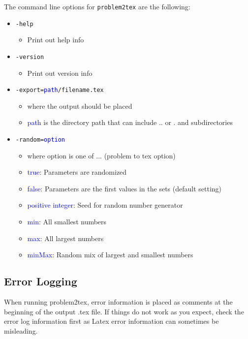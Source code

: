 \documentclass{article}
\begin{document}
The command line options for \texttt{problem2tex} are the following:
\begin{itemize}
\item \texttt{-help}
\begin{itemize}
\item[] Print out help info
\end{itemize}
\item \texttt{-version}
\begin{itemize}
\item[] Print out version info
\end{itemize}
\item \texttt{-export=\textcolor{blue}{path}/filename.tex} 
\begin{itemize}
\item[] where the output should be placed 
\item[] \textcolor{blue}{path} is the directory path that can include .. or . and subdirectories
\end{itemize}
\item \texttt{-random=\textcolor{blue}{option}}
\begin{itemize}
\item[] where option is one of ... (problem to tex option)
\item[] \textcolor{blue}{true}: Parameters are randomized
\item[] \textcolor{blue}{false}: Parameters are the first values in the sets (default setting)
\item[] \textcolor{blue}{positive integer}: Seed for random number generator
\item[] \textcolor{blue}{min}: All smallest numbers 
\item[] \textcolor{blue}{max}: All largest numbers
\item[] \textcolor{blue}{minMax}: Random mix of largest and smallest numbers

\end{itemize}

\end{itemize}

\subsection{Error Logging}

When running problem2tex, error information is placed as comments at the beginning of the output .tex file.  If things do not work as you expect, check the error log information first as Latex error information can sometimes be misleading.
\end{document}
